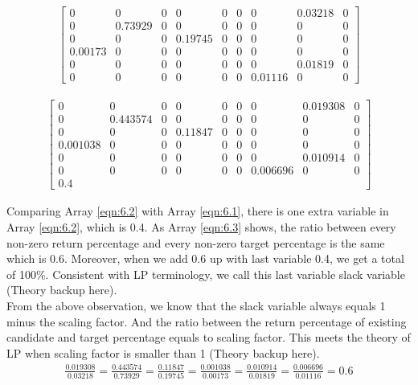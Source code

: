 \begin{eqnarray}\label{eqn:6.1}
\begin {bmatrix}
0& 0& 0& 0& 0& 0& 0& 0.03218& 0 \\
0& 0.73929& 0& 0& 0& 0& 0& 0& 0 \\
0& 0& 0& 0.19745& 0& 0& 0& 0& 0 \\
0.00173& 0& 0& 0& 0& 0& 0& 0& 0 \\
0& 0& 0& 0& 0& 0& 0& 0.01819& 0 \\ 
0& 0& 0& 0& 0& 0& 0.01116& 0& 0
\end {bmatrix}
\end{eqnarray}

\begin{eqnarray}\label{eqn:6.2}
\begin {bmatrix}
0& 0& 0& 0& 0& 0& 0& 0.019308& 0 \\
0& 0.443574& 0& 0& 0& 0& 0& 0& 0 \\
0& 0& 0& 0.11847& 0& 0& 0& 0& 0  \\
0.001038& 0& 0& 0& 0& 0& 0& 0& 0 \\ 
0& 0& 0& 0& 0& 0& 0& 0.010914& 0 \\
0& 0& 0& 0& 0& 0& 0.006696& 0& 0 \\
0.4
\end {bmatrix}
\end{eqnarray}

Comparing Array \ref{eqn:6.2} with Array \ref{eqn:6.1}, there is one extra variable in Array \ref{eqn:6.2}, which is 0.4. As Array \ref{eqn:6.3} shows, the ratio between every non-zero return percentage and every non-zero target percentage is the same which is 0.6.
Moreover, when we add 0.6 up with last variable 0.4, we get a total of 100\%. Consistent with LP terminology, we call this last variable slack variable (Theory backup here).\\

From the above observation, we know that the slack variable always equals 1 minus the scaling factor. And the ratio between the return percentage of existing candidate and target percentage equals to scaling factor. This meets the theory of LP when scaling factor is smaller than 1 (Theory backup here). \\

\begin{eqnarray} \label{eqn:6.3}
\frac{0.019308}{0.03218} = \frac{0.443574}{0.73929} = \frac{0.11847}{0.19745} =\frac{0.001038}{0.00173}  = \frac{0.010914}{0.01819} = \frac{0.006696}{0.01116} = 0.6
\end{eqnarray}

